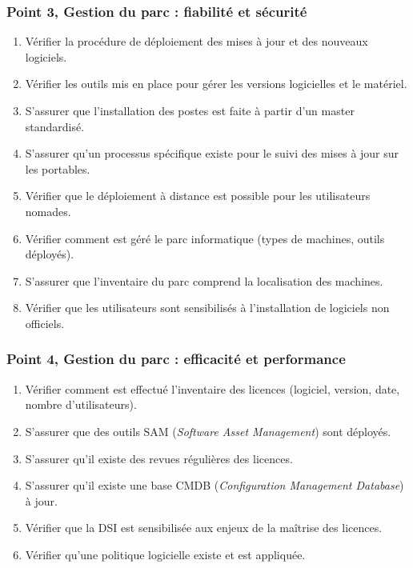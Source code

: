 \subsubsection{Point 3, Gestion du parc : fiabilité et sécurité}
\begin{enumerate}[label=3.\arabic*.]
    \item Vérifier la procédure de déploiement des mises à jour et des nouveaux logiciels.
    \item Vérifier les outils mis en place pour gérer les versions logicielles et le matériel.
    \item S'assurer que l'installation des postes est faite à partir d'un master standardisé.
    \item S'assurer qu'un processus spécifique existe pour le suivi des mises à jour sur les portables.
    \item Vérifier que le déploiement à distance est possible pour les utilisateurs nomades.
    \item Vérifier comment est géré le parc informatique (types de machines, outils déployés).
    \item S'assurer que l'inventaire du parc comprend la localisation des machines.
    \item Vérifier que les utilisateurs sont sensibilisés à l'installation de logiciels non officiels.
\end{enumerate}

\subsubsection{Point 4, Gestion du parc : efficacité et performance}
\begin{enumerate}[label=4.\arabic*.]
    \item Vérifier comment est effectué l'inventaire des licences (logiciel, version, date, nombre d'utilisateurs).
    \item S'assurer que des outils SAM (\textit{Software Asset Management}) sont déployés.
    \item S'assurer qu'il existe des revues régulières des licences.
    \item S'assurer qu'il existe une base CMDB (\textit{Configuration Management Database}) à jour.
    \item Vérifier que la DSI est sensibilisée aux enjeux de la maîtrise des licences.
    \item Vérifier qu'une politique logicielle existe et est appliquée.
\end{enumerate}

